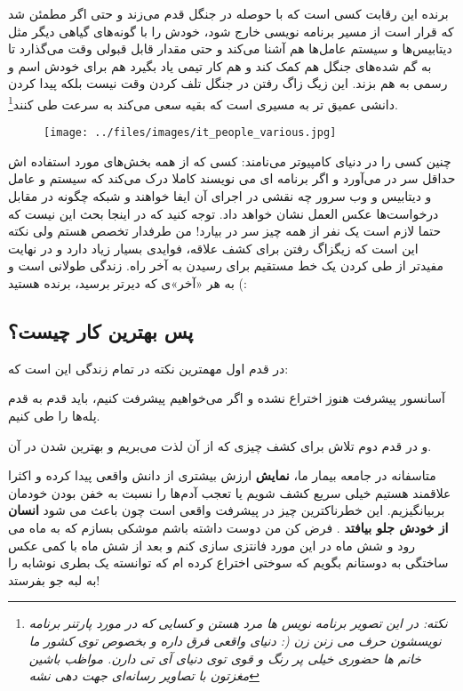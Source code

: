 برنده این رقابت کسی است که با حوصله در جنگل قدم می‌زند و حتی اگر مطمئن شد که قرار است از مسیر برنامه نویسی خارج شود، خودش را با گونه‌های گیاهی دیگر مثل دیتابیس‌ها و سیستم عامل‌ها هم آشنا می‌کند و حتی مقدار قابل قبولی وقت می‌گذارد تا به گم شده‌های جنگل هم کمک کند و هم کار تیمی یاد بگیرد هم برای خودش اسم و رسمی به هم بزند. این زیگ زاگ رفتن در جنگل تلف کردن وقت نیست بلکه پیدا کردن دانشی عمیق تر به مسیری است که بقیه سعی می‌کند به سرعت طی کنند\footnote{
	\emph{نکته: در این تصویر برنامه نویس ها مرد هستن و کسایی که در مورد پارتنر برنامه نویسشون حرف می زنن زن (: دنیای واقعی فرق داره و بخصوص توی کشور ما خانم ها حضوری خیلی پر رنگ و قوی توی دنیای آی تی دارن. مواظب باشین مغزتون با تصاویر رسانه‌ای جهت دهی نشه}}.
\begin{figure}[H]
	\begin{center}
		\texttt{[image: ../files/images/it\_people\_various.jpg]}
	\end{center}
\end{figure}
چنین کسی را در دنیای کامپیوتر  می‌نامند: کسی که از همه بخش‌های مورد استفاده اش حداقل سر در می‌آورد و اگر برنامه ای می نویسند کاملا درک می‌کند که سیستم و عامل و دیتابیس و وب سرور چه نقشی در اجرای آن ایفا خواهند و شبکه چگونه در مقابل درخواست‌ها عکس العمل نشان خواهد داد. توجه کنید که در اینجا بحث این نیست که حتما لازم است یک نفر از همه چیز سر در بیارد! من طرفدار تخصص هستم ولی نکته این است که زیگزاگ رفتن برای کشف علاقه، فوایدی بسیار زیاد دارد و در نهایت مفیدتر از طی کردن یک خط مستقیم برای رسیدن به آخر راه. زندگی طولانی است و به هر «آخر»ی که دیرتر برسید، برنده هستید‌ (:
\subsection*{پس بهترین کار چیست؟}
در قدم اول مهمترین نکته در تمام زندگی این است که:

آسانسور پیشرفت هنوز اختراع نشده و اگر می‌خواهیم پیشرفت کنیم، باید قدم به قدم پله‌ها را طی کنیم.

و در قدم دوم تلاش برای کشف چیزی که از آن لذت می‌بریم و بهترین شدن در آن.

متاسفانه در جامعه بیمار ما،
\textbf{نمایش}
ارزش بیشتری از دانش واقعی پیدا کرده و اکثرا علاقمند هستیم خیلی سریع کشف شویم یا تعجب آدم‌ها را نسبت به خفن بودن خودمان بربیانگیزیم. این خطرناکترین چیز در پیشرفت واقعی است چون باعث می شود
\textbf{انسان از خودش جلو بیافتد}
.
فرض کن من دوست داشته باشم موشکی بسازم که به ماه می رود و شش ماه در این مورد فانتزی سازی کنم و بعد از شش ماه با کمی عکس ساختگی به دوستانم بگویم که سوختی اختراع کرده ام که توانسته یک بطری نوشابه را به لبه جو بفرستد! 

